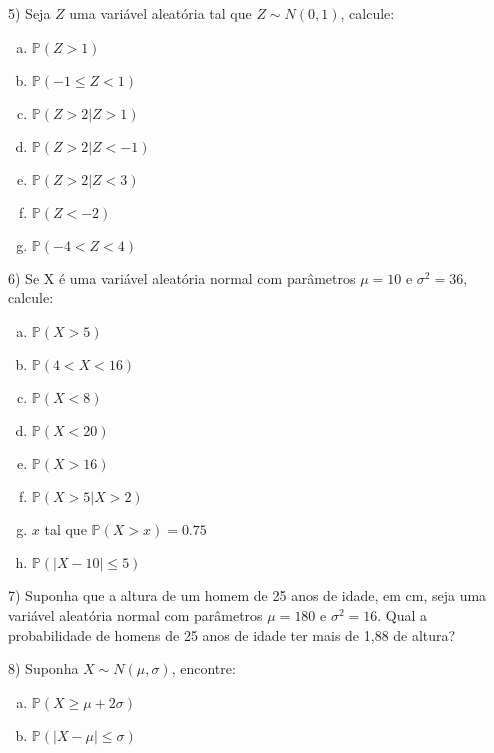 \documentclass{article}
\begin{document}
\vspace{5px}

5) Seja $Z$ uma variável aleatória tal que $Z\sim N(0,1)$, calcule:

\begin{enumerate}[a)]
    \item $\mathds{P}(Z>1)$
    \item $\mathds{P}(-1 \leq Z<1)$
    \item  $\mathds{P}(Z>2| Z> 1)$
    \item $\mathds{P}(Z>2| Z< -1)$
    \item $\mathds{P}(Z>2| Z< 3)$
    \item $\mathds{P}(Z<-2)$
    \item $\mathds{P}(-4<Z<4)$
\end{enumerate}

\vspace{5px}

6) Se X é uma variável aleatória normal com parâmetros $\mu=10$ e $\sigma^2=36$, calcule:

\begin{enumerate}[a)]
    \item $\mathds{P}(X>5)$
    \item $\mathds{P}(4<X<16)$
    \item $\mathds{P}(X<8)$
    \item $\mathds{P}(X<20)$
    \item $\mathds{P}(X>16)$
    \item $\mathds{P}(X>5 | X> 2)$
    \item $x$ tal que $\mathds{P}(X>x) = 0.75$
    \item $\mathds{P}(|X-10| \leq 5)$
\end{enumerate}

\vspace{5px}

7)  Suponha que a altura de um homem de 25 anos de idade, em cm, seja uma variável aleatória normal com parâmetros $\mu = 180$ e $\sigma^2=16$. 
Qual a probabilidade de homens de 25 anos de idade ter mais de 1,88 de altura?

\vspace{5px}

8) Suponha $X \sim N(\mu, \sigma)$, encontre:
\begin{enumerate}[a)]
    \item $\mathds{P}(X \geq \mu + 2\sigma)$
    \item $\mathds{P}(|X-\mu| \leq \sigma)$
\end{enumerate}
\vspace{5px}
\end{document}

